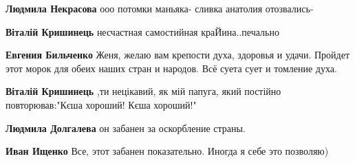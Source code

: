 \begin{itemize}
\begin{itemize}
\textbf{Людмила Некрасова} ооо потомки маньяка- сливка анатолия отозвались-

 
\textbf{Віталій Кришинець} несчастная самостийная краЙина..печально

 
\textbf{Евгения Бильченко} Женя, желаю вам крепости духа, здоровья и удачи. Пройдет этот морок для обеих наших стран и народов. Всё суета сует и томление духа.

 
\textbf{Віталій Кришинець} ,ти нецікавий, як мій папуга, який постійно повторював:"Кєша хороший! Кєша хороший!"

 
\textbf{Людмила Долгалева} он забанен за оскорбление страны.

 
\textbf{Иван Ищенко} Все, этот забанен показательно. Иногда я себе это позволяю)
\end{itemize}

 

\end{itemize}
